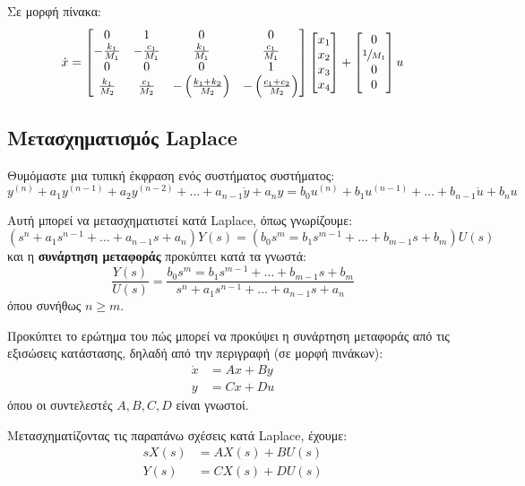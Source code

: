 \documentclass[11pt,a4paper,notitlepage,fleqn]{article}
\begin{document}
\begin{exercise}
	Σε μορφή πίνακα:
	\[
	\dot x = \left[\begin{matrix}
	0 & 1 & 0 & 0\\
	-\frac{k_1}{M_1} & -\frac{c_1}{M_1} & \frac{k_1}{M_1} & \frac{c_1}{M_1}\\
	0 & 0 & 0 & 1\\
	\frac{k_1}{M_2} & \frac{c_1}{M_2} & -\left(\frac{k_1+k_2}{M_2}\right)
	& -\left(\frac{c_1+c_2}{M_2}\right)
	\end{matrix}\right]\left[\begin{matrix}
	x_1 \\ x_2 \\ x_3 \\ x_4
	\end{matrix}\right] + \left[
	\begin{matrix}
	0 \\ \sfrac{1}{M_1} \\ 0 \\ 0
	\end{matrix}
	\right]u
	\]
\end{exercise}

\subsection{Μετασχηματισμός Laplace}
Θυμόμαστε μια τυπική έκφραση ενός συστήματος συστήματος:
\[
y^{(n)} + a_1y^{(n-1)} + a_2y^{(n-2)} + \dots + a_{n-1}\dot y + a_n y =
b_0 u^{(n)} + b_1u^{(n-1)} + \dots + b_{n-1}\dot u + b_n u
\]

Αυτή μπορεί να μετασχηματιστεί κατά Laplace, όπως γνωρίζουμε:
\[
\left(
s^n + a_1s^{n-1} + \dots + a_{n-1}s + a_n
\right)Y(s) = \left(
b_0s^m = b_1s^{m-1} + \dots + b_{m-1}s+b_m
\right)U(s)
\]
και η \textbf{συνάρτηση μεταφοράς} προκύπτει κατά τα γνωστά:
\[
\frac{Y(s)}{U(s)} = \frac{
	b_0s^m = b_1s^{m-1} + \dots + b_{m-1}s+b_m
	}{
	s^n + a_1s^{n-1} + \dots + a_{n-1}s + a_n
	}
\] όπου συνήθως \( n \geq m \).

Προκύπτει το ερώτημα του πώς μπορεί να προκύψει η συνάρτηση μεταφοράς από τις εξισώσεις
κατάστασης, δηλαδή από την περιγραφή (σε μορφή πινάκων):
\begin{align*}
\dot x &= Ax	+ By\\
y &= Cx + Du
\end{align*}
όπου οι συντελεστές \( A,B,C,D \) είναι γνωστοί.

Μετασχηματίζοντας τις παραπάνω σχέσεις κατά Laplace, έχουμε:
\begin{align*}
	sX(s) &= AX(s) + BU(s) \\
	Y(s) &= CX(s) + DU(s)
\end{align*}
\end{document}
